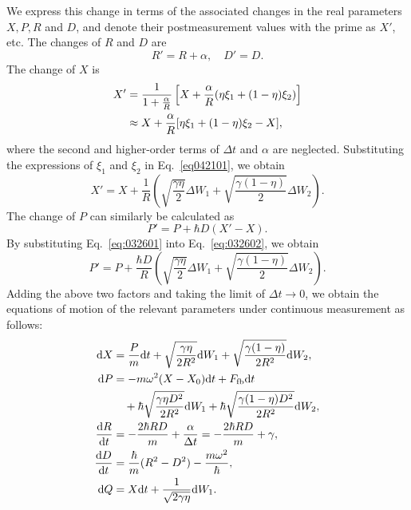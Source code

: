 \documentclass[aps,pra,superscriptaddress,twocolumn
]{revtex4-2}
\renewcommand{\d}{{\rm d}}
\begin{document}
 We express this change in terms of the associated changes in the real parameters $X,P,R$ and $D$, 
 and denote their postmeasurement values with the prime as $X'$, etc.
 The changes of $R$ and $D$ are  
 \begin{equation}
  R' = R + \alpha, \quad D' = D.
 \end{equation} 
 The change of $X$ is 
 \begin{alignat}{1}
  X' &= \frac{1}{1+\frac{\alpha}{R}} \left[X+\frac{\alpha}{R}(\eta \xi_1 + (1-\eta) \xi_2) \right] \notag \\
   &\approx X + \frac{\alpha}{R}[\eta \xi_1 + (1-\eta)\xi_2 - X],\label{eq042101}
 \end{alignat}
 where the second and higher-order terms of $\Delta t$ and $\alpha$ are neglected.
 Substituting the expressions of $\xi_1$ and $\xi_2$ in Eq.~\eqref{eq042101},
 we obtain 
 \begin{equation}
  X' = X + \frac{1}{R}\left(\sqrt{\frac{\gamma\eta}{2}}\Delta W_1 + \sqrt{\frac{\gamma(1-\eta)}{2}} \Delta W_2\right).
  \label{eq:032601}
 \end{equation}
 The change of $P$ can similarly be calculated as 
 \begin{equation}
  P' = P + \hbar D (X'-X). \label{eq:032602}
 \end{equation}
 By substituting Eq.~\eqref{eq:032601} into Eq.~\eqref{eq:032602}, we obtain 
 \begin{equation}
  P' = P + \frac{\hbar D}{R}\left(\sqrt{\frac{\gamma\eta}{2}}\Delta W_1 + \sqrt{\frac{\gamma(1-\eta)}{2}} \Delta W_2\right).
 \end{equation}
 Adding the above two factors and taking the limit of $\Delta t\to 0$, 
 we obtain the equations of motion of the relevant parameters under continuous measurement as follows:
 \begin{alignat}{1}
  \d X &= \frac{P}{m}\d t + \sqrt{\frac{\gamma\eta}{2R^2}}\d W_1 + \sqrt{\frac{\gamma(1-\eta)}{2R^2}} \d W_2, \\
  \d P &= - m\omega^2 (X-X_0)\d t + F_{\rm fb} \d t \notag \\ 
  &\quad + \hbar \sqrt{\frac{\gamma\eta D^2}{2R^2}}\d W_1 + \hbar \sqrt{\frac{\gamma(1-\eta)D^2}{2R^2}}\d W_2,  \\
  \frac{\d R}{\d t} &= {-} \frac{2\hbar RD}{m} + \frac{\alpha}{\Delta t} = {-} \frac{2\hbar RD}{m} + \gamma, \\
  \frac{\d D}{\d t} &= \frac{\hbar}{m}(R^2 - D^2) - \frac{m\omega^2}{\hbar}, \\
  \d Q &= X \d t +\frac{1}{\sqrt{2\gamma\eta}}\d W_1.
 \end{alignat}
 
\end{document}
